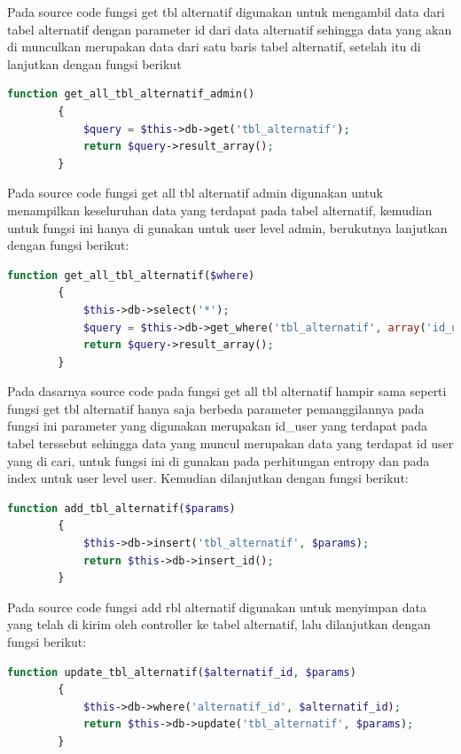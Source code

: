 Pada source code fungsi get tbl alternatif digunakan untuk mengambil data dari tabel alternatif dengan parameter id dari data alternatif sehingga data yang akan di munculkan merupakan data dari satu baris tabel alternatif, setelah itu di lanjutkan dengan fungsi berikut\par

\begin{lstlisting}[language=PHP]
	function get_all_tbl_alternatif_admin()  
	    {  
	        $query = $this->db->get('tbl_alternatif');  
	        return $query->result_array();  
	    }  
\end{lstlisting}

Pada source code fungsi get all tbl alternatif admin digunakan untuk menampilkan keseluruhan data yang terdapat pada tabel alternatif, kemudian untuk fungsi ini hanya di gunakan untuk user level admin, berukutnya lanjutkan dengan fungsi berikut:\par

\begin{lstlisting}[language=PHP]
	function get_all_tbl_alternatif($where)  
	    {  
	        $this->db->select('*');  
	        $query = $this->db->get_where('tbl_alternatif', array('id_user' => $where));  
	        return $query->result_array();  
	    }  
\end{lstlisting}

Pada dasarnya source code pada fungsi get all tbl alternatif hampir sama seperti fungsi get tbl alternatif hanya saja berbeda parameter pemanggilannya pada fungsi ini parameter yang digunakan merupakan id\_user yang terdapat pada tabel terssebut sehingga data yang muncul merupakan data yang terdapat id user yang di cari, untuk fungsi ini di gunakan pada perhitungan entropy dan pada index untuk user level user. Kemudian dilanjutkan dengan fungsi berikut:\par

\begin{lstlisting}[language=PHP]
	    function add_tbl_alternatif($params)  
	    {  
	        $this->db->insert('tbl_alternatif', $params);  
	        return $this->db->insert_id();  
	    }
\end{lstlisting}

Pada source code fungsi add rbl alternatif digunakan untuk menyimpan data yang telah di kirim oleh controller ke tabel alternatif, lalu dilanjutkan dengan fungsi berikut:\par

\begin{lstlisting}[language=PHP]
	    function update_tbl_alternatif($alternatif_id, $params) 
	    {  
	        $this->db->where('alternatif_id', $alternatif_id);  
	        return $this->db->update('tbl_alternatif', $params); 
	    }  
\end{lstlisting}

